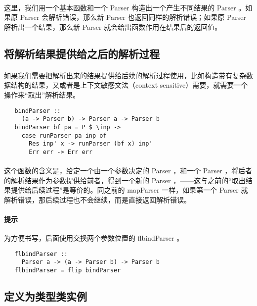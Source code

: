 \documentclass{article}
\begin{document}
   \paragraph{}
    这里，我们用一个基本函数和一个 Parser 构造出一个产生不同结果的 Parser 。如果原 Parser 会解析错误，那么新 Parser 也返回同样的解析错误；如果原 Parser 解析出一个结果，那么新 Parser 就会给出函数作用在结果后的返回值。
  \subsection{将解析结果提供给之后的解析过程}
   \paragraph{}
    如果我们需要把解析出来的结果提供给后续的解析过程使用，比如构造带有复杂数据结构的结果，又或者是上下文敏感文法（context sensitive）需要，就需要一个操作来“取出”解析结果。
   \begin{lstlisting}
   bindParser :: 
     (a -> Parser b) -> Parser a -> Parser b
   bindParser bf pa = P $ \inp ->
     case runParser pa inp of
       Res inp' x -> runParser (bf x) inp'
       Err err -> Err err
   \end{lstlisting} 
   \paragraph{}
    这个函数的含义是，给定一个由一个参数决定的 Parser ，和一个 Parser ，将后者的解析结果作为参数提供给前者，得到一个新的 Parser ，——这与之前的“取出结果提供给后续过程”是等价的。同之前的 mapParser 一样，如果第一个 Parser 就解析错误，那后续过程也不会继续，而是直接返回解析错误。
   \paragraph{提示}
    为方便书写，后面使用交换两个参数位置的 flbindParser 。
   \begin{lstlisting}
   flbindParser :: 
     Parser a -> (a -> Parser b) -> Parser b
   flbindParser = flip bindParser
   \end{lstlisting}
   
  \subsection{定义为类型类实例}
\end{document}
